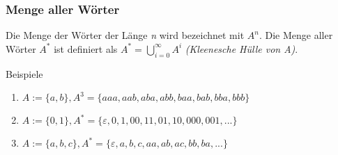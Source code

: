 \begin{frame}
  \frametitle{Menge aller Wörter}
  \begin{definition}
    Die Menge der Wörter der Länge \emph{n} wird bezeichnet mit $A^n$. Die Menge aller Wörter $A^*$ ist definiert als $A^* = \bigcup \limits^{\infty}_{i=0} A^i$ \emph{(Kleenesche Hülle von A)}.
  \end{definition}
  \begin{exampleblock}{Beispiele}
    \begin{enumerate}
      \item $A := \{a, b\}, A^3 = \{aaa, aab, aba, abb, baa, bab, bba, bbb\}$
      \item $A := \{0, 1\}, A^* = \{\varepsilon, 0, 1, 00, 11, 01, 10, 000, 001, ...\}$
      \item $A := \{a, b, c\}, A^* = \{\varepsilon, a, b, c, aa, ab, ac, bb, ba, ...\}$
    \end{enumerate}
  \end{exampleblock}
\end{frame}

